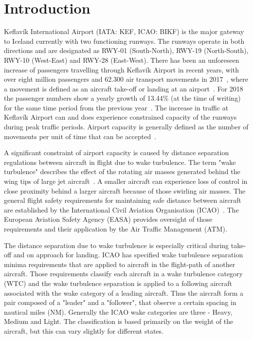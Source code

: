 \chapter{Introduction\label{cha:introduction}}

Keflavík International Airport (IATA: KEF, ICAO: BIKF) is the major gateway to Iceland currently with two functioning runways. The runways operate in both directions and are designated as RWY-01 (South-North), RWY-19 (North-South), RWY-10 (West-East) and RWY-28 (East-West). 
There has been an unforeseen increase of passengers travelling through Keflavík Airport in recent years, with over eight million passengers and 62.300 air transport movements in 2017~\cite{isavia_facts_2017}, where a movement is defined as an aircraft take-off or landing at an airport~\cite{aircraft_movement}. For 2018 the passenger numbers show a yearly growth of 13.44\% (at the time of writing) for the same time period from the previous year~\cite{isavia_pass_statistics_2018}. The increase in traffic at Keflavík Airport can and does experience constrained capacity of the runways during peak traffic periods. Airport capacity is generally defined as the number of movements per unit of time that can be accepted~\cite{airport_capacity_methodology}.  

A significant constraint of airport capacity is caused by distance separation regulations between aircraft in flight due to wake turbulence. The term "wake turbulence" describes the effect of the rotating air masses generated behind the wing tips of large jet aircraft~\cite{doc4444full}. A smaller aircraft can experience loss of control in close proximity behind a larger aircraft because of those swirling air masses. The general flight safety requirements for maintaining safe distance between aircraft are established by the International Civil Aviation Organisation (ICAO)~\cite{doc4444full}. The European Aviation Safety Agency (EASA) provides oversight of those requirements and their application by the Air Traffic Management (ATM). 

The distance separation due to wake turbulence is especially critical during take-off and on approach for landing. ICAO has specified wake turbulence separation minima requirements that are applied to aircraft in the flight-path of another aircraft. Those requirements classify each aircraft in a wake turbulence category (WTC) and the wake turbulence separation is applied to a following aircraft associated with the wake category of a leading aircraft. Thus the aircraft form a pair composed of a "leader" and a "follower", that observe a certain spacing in nautical miles (NM). Generally the ICAO wake categories are three - Heavy, Medium and Light. The classification is based primarily on the weight of the aircraft, but this can vary slightly for different states.


